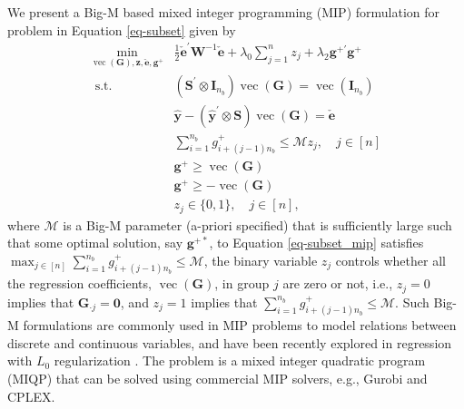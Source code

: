 \documentclass[
  12pt,
  11pt]{article}
\begin{document}
We present a Big-M based mixed integer programming (MIP) formulation for
problem in Equation \ref{eq-subset} given by
\begin{align} \label{eq-subset_mip}
\min _{\operatorname{vec}(\bm{G}), \bm{z}, \check{\bm{e}}, \bm{g}^{+}} & \frac{1}{2}\check{\bm{e}}^{\prime} \bm{W}^{-1}\check{\bm{e}} + \lambda_0 \sum_{j=1}^n z_j + \lambda_2 \bm{g}^{+\prime}\bm{g}^{+} \\
\text { s.t. } \quad & \left(\bm{S}^{\prime} \otimes \bm{I}_{n_b}\right) \operatorname{vec}(\bm{G})=\operatorname{vec}\left(\bm{I}_{n_b}\right)\nonumber \\
& \hat{\bm{y}}-\left(\hat{\bm{y}}^{\prime} \otimes \bm{S}\right)\operatorname{vec}(\bm{G}) = \check{\bm{e}} \nonumber\\
& \sum_{i=1}^{n_b} g_{i + (j-1) n_b}^{+} \leqslant \mathcal{M} z_j, \quad j \in[n] \nonumber\\
& \bm{g}^{+} \geqslant \operatorname{vec}(\bm{G}) \nonumber\\
& \bm{g}^{+} \geqslant-\operatorname{vec}(\bm{G}) \nonumber\\
& z_j \in\{0,1\}, \quad j \in[n],
\end{align} where \(\mathcal{M}\) is a Big-M parameter (a-priori
specified) that is sufficiently large such that some optimal solution,
say \(\bm{g}^{+*}\), to Equation \ref{eq-subset_mip} satisfies
\(\max _{j \in [n]}\sum_{i=1}^{n_b} g_{i + (j-1) n_b}^{+} \leqslant \mathcal{M}\),
the binary variable \(z_j\) controls whether all the regression
coefficients, \(\operatorname{vec}(\bm{G})\), in group \(j\) are zero or
not, i.e., \(z_j=0\) implies that \(\bm{G}_{\cdot j}=\bm{0}\), and
\(z_j=1\) implies that
\(\sum_{i=1}^{n_b} g_{i + (j-1) n_b}^{+} \leqslant \mathcal{M}\). Such
Big-M formulations are commonly used in MIP problems to model relations
between discrete and continuous variables, and have been recently
explored in regression with \(L_0\) regularization
\citep{Bertsimas2016-ig}. The problem is a mixed integer quadratic
program (MIQP) that can be solved using commercial MIP solvers, e.g.,
Gurobi and CPLEX.
\end{document}
